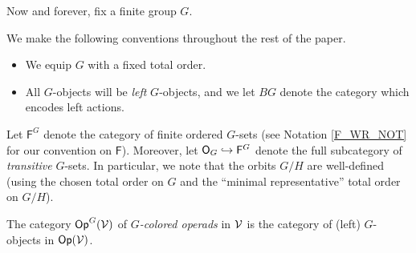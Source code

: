\documentclass[a4paper,10pt
,draft
]{article}%
\renewcommand{\1}{\eta}%
\begin{document}
Now and forever, fix a finite group $G$.

\begin{convention}
      \label{G_CONV}
      We make the following conventions throughout the rest of the paper.
      \begin{itemize} %
      \item We equip $G$ with a fixed total order.
      \item All $G$-objects will be \textit{left} $G$-objects,
            and we let $BG$ denote the category which encodes left actions.            
      \end{itemize}
\end{convention}

      

\begin{notation}
      Let $\mathsf F^G$ denote the category of finite ordered $G$-sets (see Notation \ref{F_WR_NOT} for our convention on $\mathsf F$).
      Moreover, let $\mathsf O_G \hookrightarrow \mathsf F^G$ denote the full subcategory of \textit{transitive} $G$-sets.
      In particular, we note that the orbits $G/H$ are well-defined
      (using the chosen total order on $G$
      and the ``minimal representative'' total order on $G/H$).
\end{notation}

\begin{definition}
      The category $\mathsf{Op}^G(\mathcal V)$ of  \textit{$G$-colored operads} in $\mathcal V$ is the category of
      (left) $G$-objects in $\mathsf{Op}(\mathcal V)$.
\end{definition}
\end{document}
